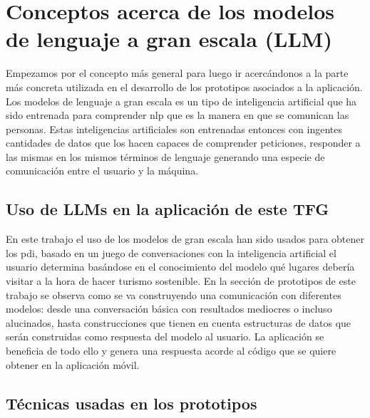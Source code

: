 \section{Conceptos acerca de los modelos de lenguaje a gran escala (LLM)}

Empezamos por el concepto más general para luego ir acercándonos a la parte más concreta utilizada en el desarrollo de los prototipos asociados a la aplicación. Los modelos de lenguaje a gran escala es un tipo de inteligencia artificial que ha sido entrenada para comprender \acrfull{nlp} que es la manera en que se comunican las personas. Estas inteligencias artificiales son entrenadas entonces con ingentes cantidades de datos que los hacen capaces de comprender peticiones, responder a las mismas en los mismos términos de lenguaje generando una especie de comunicación entre el usuario y la máquina.



\subsection{Uso de LLMs en la aplicación de este TFG}

En este trabajo el uso de los modelos de gran escala han sido usados para obtener los \acrfull{pdi}, basado en un juego de conversaciones con la inteligencia artificial el usuario determina basándose en el conocimiento del modelo qué lugares debería visitar a la hora de hacer turismo sostenible.
En la sección de prototipos de este trabajo se observa como se va construyendo una comunicación con diferentes modelos: desde una conversación básica con resultados mediocres o incluso alucinados, hasta construcciones que tienen en cuenta estructuras de datos que serán construidas como respuesta del modelo al usuario. La aplicación se beneficia de todo ello y genera una respuesta acorde al código que se quiere obtener en la aplicación móvil.
\subsection{Técnicas usadas en los prototipos}
